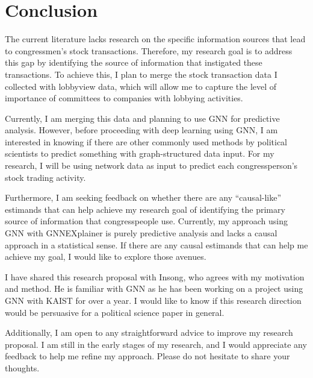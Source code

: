 \documentclass[15pt,letterpaper]{article}
\begin{document}
\section{Conclusion}
The current literature lacks research on the specific information sources that lead to congressmen's stock transactions. Therefore, my research goal is to address this gap by identifying the source of information that instigated these transactions. To achieve this, I plan to merge the stock transaction data I collected with lobbyview data, which will allow me to capture the level of importance of committees to companies with lobbying activities.

Currently, I am merging this data and planning to use GNN for predictive analysis. However, before proceeding with deep learning using GNN, I am interested in knowing if there are other commonly used methods by political scientists to predict something with graph-structured data input. For my research, I will be using network data as input to predict each congressperson's stock trading activity.

Furthermore, I am seeking feedback on whether there are any ``causal-like'' estimands that can help achieve my research goal of identifying the primary source of information that congresspeople use. Currently, my approach using GNN with GNNEXplainer is purely predictive analysis and lacks a causal approach in a statistical sense. If there are any causal estimands that can help me achieve my goal, I would like to explore those avenues.

I have shared this research proposal with Insong, who agrees with my motivation and method. He is familiar with GNN as he has been working on a project using GNN with KAIST for over a year. I would like to know if this research direction would be persuasive for a political science paper in general.

Additionally, I am open to any straightforward advice to improve my research proposal. I am still in the early stages of my research, and I would appreciate any feedback to help me refine my approach. Please do not hesitate to share your thoughts.




\end{document}
